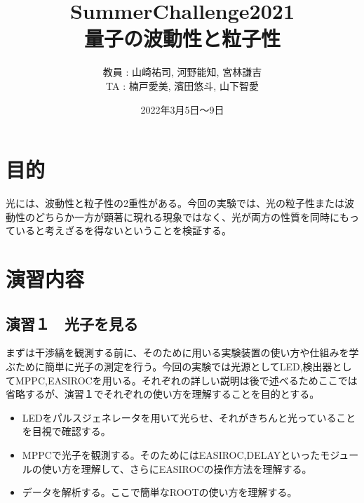 \documentclass[uplatex,10pt,a4j]{jsarticle}
\begin{document}
\begin{titlepage}
  \title{SummerChallenge2021 \\ \Huge 量子の波動性と粒子性}

  \author{教員 : 山崎祐司, 河野能知, 宮林謙吉 \\TA : 楠戸愛美, 濱田悠斗, 山下智愛}
  \date{2022年3月5日〜9日}
  \maketitle
\end{titlepage}

\tableofcontents
\clearpage

\section{目的}
光には、波動性と粒子性の2重性がある。今回の実験では、光の粒子性または波動性のどちらか一方が顕著に現れる現象ではなく、光が両方の性質を同時にもっていると考えざるを得ないということを検証する。

\section{演習内容}

\subsection{演習１　光子を見る}
まずは干渉縞を観測する前に、そのために用いる実験装置の使い方や仕組みを学ぶために簡単に光子の測定を行う。今回の実験では光源としてLED,検出器としてMPPC,EASIROCを用いる。それぞれの詳しい説明は後で述べるためここでは省略するが、演習１でそれぞれの使い方を理解することを目的とする。
\begin{itemize}
  \item LEDをパルスジェネレータを用いて光らせ、それがきちんと光っていることを目視で確認する。
  \item MPPCで光子を観測する。そのためにはEASIROC,DELAYといったモジュールの使い方を理解して、さらにEASIROCの操作方法を理解する。
  \item データを解析する。ここで簡単なROOTの使い方を理解する。
\end{itemize}
\end{document}
